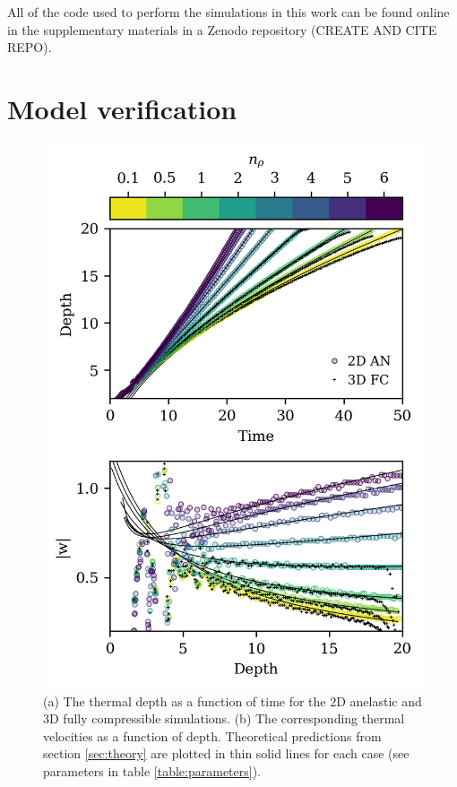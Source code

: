 \documentclass[twocolumn, amsmath, amsfonts, amssymb, trackchanges]{aastex62}
\begin{document}
All of the code used to perform the simulations in this work can be found online in the supplementary materials in a Zenodo repository (CREATE AND CITE REPO).


\section{Model verification}
\label{sec:results}
\begin{figure}[t!]
    \includegraphics[width=\columnwidth]{results_panels.png}
    \caption{
	(a) The thermal depth as a function of time for the 2D anelastic and 3D fully compressible simulations.
	(b) The corresponding thermal velocities as a function of depth.
	Theoretical predictions from section \ref{sec:theory} are plotted in thin solid lines for each case (see parameters in table \ref{table:parameters}).
    \label{fig:results_panels} }
\end{figure}
\end{document}
